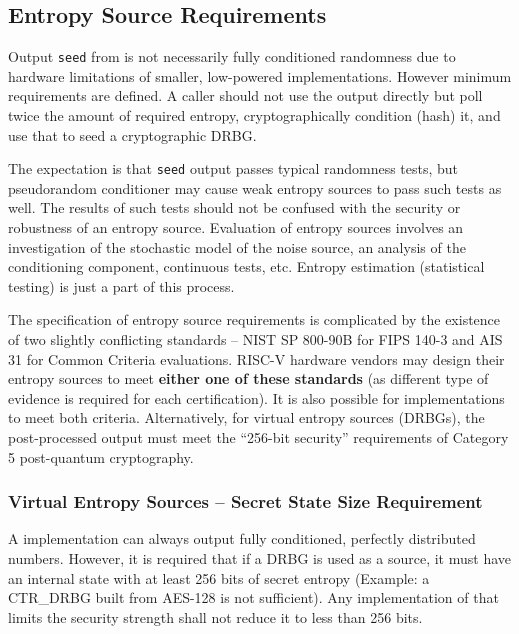 \subsection{Entropy Source Requirements}
\label{sec:req-es}
\label{sec:req-entropy}
\label{sec:req-iid}
\label{sec:req-state}

    Output \verb|seed| from  is not necessarily fully
    conditioned randomness due to hardware limitations of smaller,
    low-powered implementations. However minimum requirements are
    defined. A caller should not use the output directly but poll
    twice the amount of required entropy, cryptographically condition
    (hash) it, and use that to seed a cryptographic DRBG.

    The expectation is that \verb|seed| output passes typical randomness
    tests, but pseudorandom conditioner may cause weak entropy sources to
    pass such tests as well. The results of such tests should not be
    confused with the security or robustness of an entropy source.
    Evaluation of entropy sources involves an investigation of the
    stochastic model of the noise source, an analysis of the conditioning
    component, continuous tests, etc. Entropy estimation (statistical
    testing) is just a part of this process.

    The specification of entropy source requirements is complicated by the
    existence of two slightly conflicting standards -- NIST SP 800-90B
    \cite{TuBaKe+18} for FIPS 140-3 and AIS 31 \cite{KiSc11} for Common
    Criteria evaluations. RISC-V hardware vendors may design their entropy
    sources to meet {\bf either one of these standards} (as different type
    of evidence is required for each certification). It is also possible for
    implementations to meet both criteria. Alternatively, for virtual
    entropy sources (DRBGs), the post-processed output must meet the
    ``256-bit security'' requirements of Category 5 post-quantum cryptography.


    \subsubsection{Virtual Entropy Sources -- Secret State Size Requirement}

    A  implementation can always output fully
    conditioned, perfectly distributed numbers. However, it is required
    that if a DRBG is used as a source, it must have an internal state with
    at least 256 bits of secret entropy (Example: a CTR\_DRBG built from
    AES-128 is not sufficient). Any implementation of 
    that limits the security strength shall not reduce it to less than
    256 bits.

